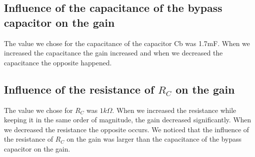 \subsection{Influence of the capacitance of the bypass capacitor on the gain}
The value we chose for the capacitance of the capacitor Cb was 1.7mF. When we increased the capacitance the gain increased and when we decreased the capacitance the opposite happened.

\subsection{Influence of the resistance of $R_C$ on the gain}
The value we chose for $R_C$  was $1k\Omega$. When we increased the resistance while keeping it in the same order of magnitude, the gain decreased significantly. When we decreased the resistance the opposite occurs. We noticed that the influence of the resistance of $R_C$ on the gain was larger than the capacitance of the bypass capacitor on the gain.
